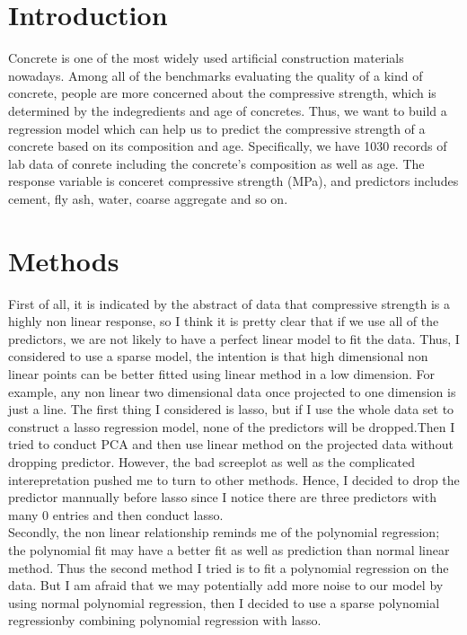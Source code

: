 \documentclass{article}\usepackage[]{graphicx}\usepackage[]{color}
\begin{document}
\section*{Introduction}
Concrete is one of the most widely used artificial construction materials nowadays. Among all of the benchmarks evaluating the quality of a kind of concrete, people are more concerned about the compressive strength, which is determined by the indegredients and age of concretes. Thus, we want to build a regression model which can help us to predict the compressive strength of a concrete based on its composition and age. Specifically, we have 1030 records of lab data of conrete including the concrete's composition as well as age. The response variable is conceret compressive strength (MPa), and predictors includes cement, fly ash, water, coarse aggregate and so on. 

\section*{Methods}
First of all, it is indicated by the abstract of data that compressive strength is a highly non linear response, so I think it is pretty clear that if we use all of the predictors, we are not likely to have a perfect linear model to fit the data. Thus, I considered to use a sparse model, the intention is that high dimensional non linear points can be better fitted using linear method in a low dimension. For example, any non linear two dimensional data once projected to one dimension is just a line. The first thing I considered is lasso, but if I use the whole data set to construct a lasso regression model, none of the predictors will be dropped.Then I tried to conduct PCA and then use linear method on the projected data without dropping predictor. However, the bad screeplot as well as the complicated interepretation pushed me to turn to other methods. Hence, I decided to drop the predictor mannually before lasso since I notice there are three predictors with many 0 entries and then conduct lasso. \\

Secondly, the non linear relationship reminds me of the polynomial regression; the polynomial fit may have a better fit as well as prediction than normal linear method. Thus the second method I tried is to fit a polynomial regression on the data. But I am afraid that we may potentially add more noise to our model by using normal polynomial regression, then I decided to use a sparse polynomial regressionby combining polynomial regression with lasso.\\
\end{document}
